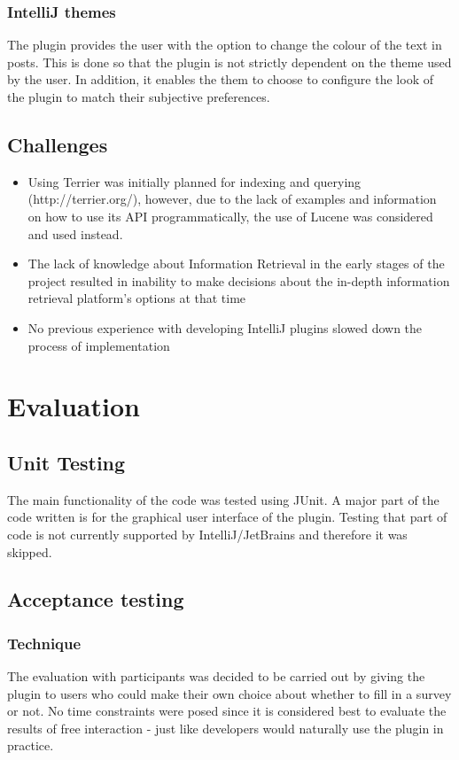 \documentclass{l4proj}
\begin{document}
\subsection{IntelliJ themes}
The plugin provides the user with the option to change the colour of the text in posts. This is done so that the plugin is not strictly dependent on the theme used by the user. In addition, it enables the them to choose to configure the look of the plugin to match their subjective preferences.


\section{Challenges}
\begin{itemize}
\item Using Terrier was initially planned for indexing and querying (http://terrier.org/), however, due to the lack of examples and information on how to use its API programmatically, the use of Lucene was considered and used instead.

\item The lack of knowledge about Information Retrieval in the early stages of the project resulted in inability to make decisions about the in-depth information retrieval platform's options at that time

\item No previous experience with developing IntelliJ plugins slowed down the process of implementation

\end{itemize}

\chapter{Evaluation}

\section{Unit Testing}
The main functionality of the code was tested using JUnit. A major part of the code written is for the graphical user interface of the plugin. Testing that part of code is not currently supported by IntelliJ/JetBrains and therefore it was skipped. 

\section{Acceptance testing}

\subsection{Technique}
The evaluation with participants was decided to be carried out by giving the plugin to users who could make their own choice about whether to fill in a survey or not. No time constraints were posed since it is considered best to evaluate the results of free interaction - just like developers would naturally use the plugin in practice. 
\end{document}
